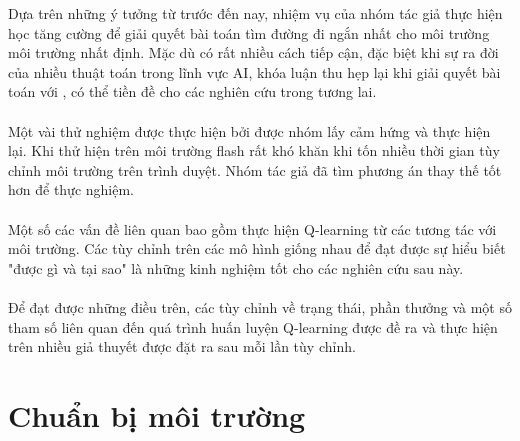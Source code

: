 Dựa trên những ý tưởng từ trước đến nay, nhiệm vụ của nhóm tác giả thực hiện học tăng cường để giải quyết bài toán tìm đường đi ngắn nhất cho môi trường môi trường nhất định. Mặc dù có rất nhiều cách tiếp cận, đặc biệt khi sự ra đời của nhiều thuật toán trong lĩnh vực AI, khóa luận thu hẹp lại khi giải quyết bài toán với , có thể tiền đề cho các nghiên cứu trong tương lai.\\
\\
Một vài thử nghiệm được thực hiện bởi \cite{WHG_yasyf}  được nhóm lấy cảm hứng và thực hiện lại. Khi \citeauthor{WHG_yasyf} thử hiện trên môi trường flash rất khó khăn khi tốn nhiều thời gian tùy chỉnh môi trường trên trình duyệt. Nhóm tác giả đã tìm phương án thay thế tốt hơn để thực nghiệm.\\
\\
Một số các vấn đề liên quan bao gồm thực hiện  Q-learning từ các tương tác với môi trường. Các tùy chỉnh trên các mô hình giống nhau để đạt được sự hiểu biết "được gì và tại sao" là những kinh nghiệm tốt cho các nghiên cứu sau này.\\
\\
Để đạt được những điều trên, các tùy chỉnh về trạng thái, phần thưởng và một số tham số liên quan đến quá trình huấn luyện Q-learning được đề ra và thực hiện trên nhiều giả thuyết được đặt ra sau mỗi lần tùy chỉnh.
\section{Chuẩn bị môi trường}
\label{env_repair}
